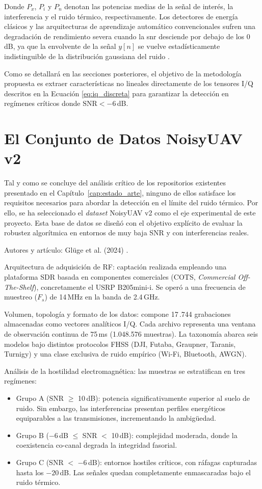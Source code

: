 Donde $P_x$, $P_i$ y $P_n$ denotan las potencias medias de la señal de interés, la interferencia y el ruido térmico, respectivamente. Los detectores de energía clásicos y las arquitecturas de aprendizaje automático convencionales sufren una degradación de rendimiento severa cuando la \gls{snr} desciende por debajo de los 0\,dB, ya que la envolvente de la señal $y[n]$ se vuelve estadísticamente indistinguible de la distribución gaussiana del ruido \cite{lacy_machine_2024}.

Como se detallará en las secciones posteriores, el objetivo de la metodología propuesta es extraer características no lineales directamente de los tensores I/Q descritos en la Ecuación \ref{eq:iq_discreta} para garantizar la detección en regímenes críticos donde $\text{SNR} < -6$\,dB.

\section{El Conjunto de Datos NoisyUAV v2}
\label{sec:dataset_noisyuav}

Tal y como se concluye del análisis crítico de los repositorios existentes presentado en el Capítulo~\ref{cap:estado_arte}, ninguno de ellos satisface los requisitos necesarios para abordar la detección en el límite del ruido térmico. Por ello, se ha seleccionado el \textit{dataset} NoisyUAV v2 como el eje experimental de este proyecto. Esta base de datos se diseñó con el objetivo explícito de evaluar la robustez algorítmica en entornos de muy baja SNR y con interferencias reales.

Autores y artículo: Glüge et al. (2024) \cite{gluge_robust_2024}.


Arquitectura de adquisición de RF: captación realizada empleando una plataforma SDR basada en componentes comerciales (COTS, \textit{Commercial Off-The-Shelf}), concretamente el USRP B205mini-i. Se operó a una frecuencia de muestreo ($F_s$) de 14\,MHz en la banda de 2.4\,GHz.

Volumen, topología y formato de los datos: compone 17\,.744 grabaciones almacenadas como vectores analíticos I/Q. Cada archivo representa una ventana de observación continua de 75\,ms (1.048.576 muestras). La taxonomía abarca seis modelos bajo distintos protocolos FHSS (DJI, Futaba, Graupner, Taranis, Turnigy) y una clase exclusiva de ruido empírico (Wi-Fi, Bluetooth, AWGN).

Análisis de la hostilidad electromagnética: las muestras se estratifican en tres regímenes:
\begin{itemize}
    \item Grupo A (SNR $\ge$ 10\,dB): potencia significativamente superior al suelo de ruido. Sin embargo, las interferencias presentan perfiles energéticos equiparables a las transmisiones, incrementando la ambigüedad.
    \item Grupo B ($-6$\,dB $\le$ SNR $<$ 10\,dB): complejidad moderada, donde la coexistencia co-canal degrada la integridad fasorial.
    \item Grupo C (SNR $<$ $-6$\,dB): entornos hostiles críticos, con ráfagas capturadas hasta los $-20$\,dB. Las señales quedan completamente enmascaradas bajo el ruido térmico.
\end{itemize}

